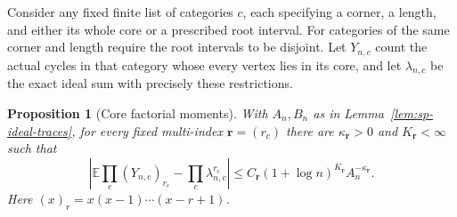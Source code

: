 \documentclass[11pt]{article}
\newtheorem{proposition}[theorem]{Proposition}
\theoremstyle{remark}
\theoremstyle{plain}
\newcommand{\E}{\mathbb E}
\begin{document}
Consider any fixed finite list of categories $c$, each specifying a
corner, a length, and either its whole core or a prescribed root interval.
For categories of the same corner and length require the root intervals
to be disjoint.  Let $Y_{n,c}$ count the actual cycles in that category
whose every vertex lies in its core, and let $\lambda_{n,c}$ be the exact
ideal sum with precisely these restrictions.

\begin{proposition}[Core factorial moments]\label{prop:sp-factorial-moments}
With $A_n,B_n$ as in Lemma~\ref{lem:sp-ideal-traces}, for every fixed
multi-index $\boldsymbol r=(r_c)$ there are
$\kappa_{\boldsymbol r}>0$ and $K_{\boldsymbol r}<\infty$ such that
\begin{equation}\label{eq:sp-factorial-comparison}
 \left|\E\prod_c(Y_{n,c})_{r_c}
             -\prod_c\lambda_{n,c}^{r_c}\right|
 \le C_{\boldsymbol r}(1+\log n)^{K_{\boldsymbol r}}
                    A_n^{-\kappa_{\boldsymbol r}}.
\end{equation}
Here $(x)_r=x(x-1)\cdots(x-r+1)$.
\end{proposition}
\end{document}
